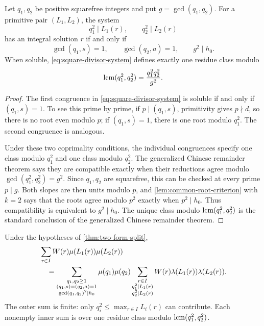 \begin{theorem}
\label{thm:square-divisor-compatibility}
Let \(q_1,q_2\) be positive squarefree integers and put
\(g=\gcd(q_1,q_2)\).  For a primitive pair
\((L_1,L_2)\), the system
\begin{equation}
 q_1^2\mid L_1(r),\qquad
 q_2^2\mid L_2(r)
\label{eq:square-divisor-system}
\end{equation}
has an integral solution \(r\) if and only if
\begin{equation}
 \boxed{
 \gcd(q_1,s)=1,\qquad
 \gcd(q_2,a)=1,\qquad
 g^2\mid h_0.}
\label{eq:square-divisor-compatibility}
\end{equation}
When soluble, \eqref{eq:square-divisor-system} defines exactly one
residue class modulo
\begin{equation}
 \operatorname{lcm}(q_1^2,q_2^2)
 =\frac{q_1^2q_2^2}{g^2}.
\label{eq:square-divisor-modulus}
\end{equation}
\end{theorem}

\begin{proof}
The first congruence in \eqref{eq:square-divisor-system} is soluble
if and only if \((q_1,s)=1\).  To see this prime by prime, if
\(p\mid(q_1,s)\), primitivity gives \(p\nmid d\), so there is no root
even modulo \(p\); if \((q_1,s)=1\), there is one root modulo
\(q_1^2\).  The second congruence is analogous.

Under these two coprimality conditions, the individual congruences
specify one class modulo \(q_1^2\) and one class modulo \(q_2^2\).
The generalized Chinese remainder theorem says they are compatible
exactly when their reductions agree modulo
\(\gcd(q_1^2,q_2^2)=g^2\).  Since \(q_1,q_2\) are squarefree, this can
be checked at every prime \(p\mid g\).  Both slopes are then units
modulo \(p\), and \cref{lem:common-root-criterion} with \(k=2\) says
that the roots agree modulo \(p^2\) exactly when \(p^2\mid h_0\).
Thus compatibility is equivalent to \(g^2\mid h_0\).  The unique
class modulo \(\operatorname{lcm}(q_1^2,q_2^2)\) is the standard conclusion of the
generalized Chinese remainder theorem.
\end{proof}

\begin{corollary}
\label{cor:exact-weighted-divisor-expansion}
Under the hypotheses of \cref{thm:two-form-split},
\begin{align}
 &\sum_{r\in I}W(r)\mu(L_1(r))\mu(L_2(r))
\notag\\
 &\quad=
 \sum_{\substack{q_1,q_2\ge1\\
                 (q_1,s)=(q_2,a)=1\\
                 \gcd(q_1,q_2)^2\mid h_0}}
 \mu(q_1)\mu(q_2)
 \sum_{\substack{r\in I\\
                 q_1^2\mid L_1(r)\\
                 q_2^2\mid L_2(r)}}
 W(r)\lambda(L_1(r))\lambda(L_2(r)).
\label{eq:exact-weighted-divisor-expansion}
\end{align}
The outer sum is finite: only \(q_i^2\le
\max_{r\in I}L_i(r)\) can contribute.  Each nonempty inner sum is
over one residue class modulo
\(\operatorname{lcm}(q_1^2,q_2^2)\).
\end{corollary}

